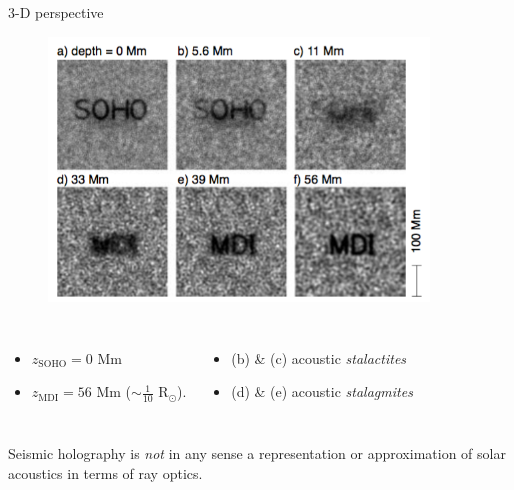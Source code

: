 \documentclass{beamer}
\begin{document}
\begin{frame}{3-D perspective}
    \begin{figure}
        \includegraphics[width=0.9\textwidth]{fig_3.png}
    \end{figure}
    \vspace{-0.5cm}
    \begin{columns}
        \column{0.5\paperwidth}
            \begin{itemize}
                \item $z_{\textrm{SOHO}} = 0$ Mm
                \item $z_{\textrm{MDI}} = 56$ Mm
                    ($\sim \frac{1}{10}$ R$_{\odot}$).
            \end{itemize}
        \column{0.5\paperwidth}
            \begin{itemize}
                \item (b) \& (c) acoustic \emph{stalactites}
                \item (d) \& (e) acoustic \emph{stalagmites}
            \end{itemize}
    \end{columns}
\end{frame}
\begin{frame}
\Large\textcolor{lemon}{Seismic holography is \emph{not} in any sense
a representation or approximation of solar acoustics in terms of ray
optics.}
\end{frame}
\end{document}
